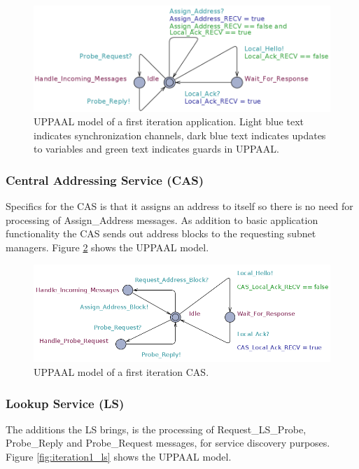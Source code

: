 \begin{figure}[h]
    \centering
    \includegraphics[width=\textwidth]{figures/iteration1_application}
    \caption{UPPAAL model of a first iteration application. Light blue text indicates
    synchronization channels, dark blue text indicates updates to variables and
green text indicates guards in UPPAAL.}
    \label{fig:iteration1_application}
\end{figure}

\subsubsection{Central Addressing Service (CAS)}
Specifics for the CAS is that it assigns an address to itself so there is no
need for processing of Assign\_Address messages. As addition to basic
application functionality the CAS sends out address blocks to the requesting
subnet managers. Figure \ref{fig:iteration1_cas} shows the UPPAAL model.

\begin{figure}[h]
    \centering
    \includegraphics[width=\textwidth]{figures/iteration1_cas}
    \caption{UPPAAL model of a first iteration CAS.}
    \label{fig:iteration1_cas}
\end{figure}

\subsubsection{Lookup Service (LS)}
The additions the LS brings, is the processing of Request\_LS\_Probe,
Probe\_Reply and Probe\_Request messages, for service discovery purposes.
Figure \ref{fig:iteration1_ls} shows the UPPAAL model.

